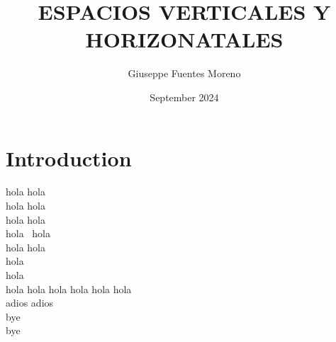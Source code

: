 \documentclass{article}
\title{ESPACIOS VERTICALES Y HORIZONATALES}
\author{Giuseppe Fuentes Moreno}
\date{September 2024}
\begin{document}
\maketitle

\section{Introduction}
hola hola\\
hola  hola\\%
hola                                    hola\\%
hola \, hola \\ %
hola \hspace{3cm} hola\\ %
\hspace{3cm} hola\\ %
\hspace*{3cm} hola\\%
hola hola hola \hfill hola hola hola\\ %

\vspace{2cm}%
adios \vspace{2cm} adios\\ %
bye \vspace{1cm}\\
bye
\end{document}
